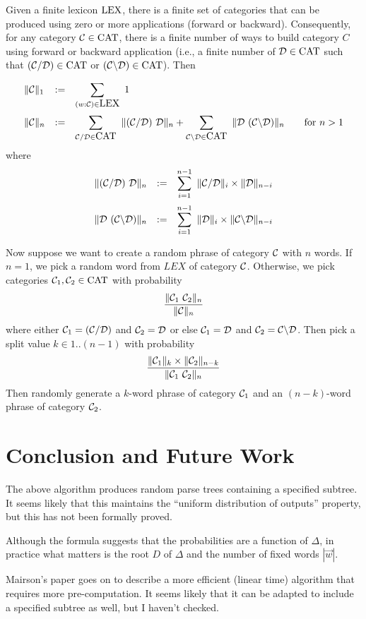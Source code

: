 \documentclass[12pt]{article}
\begin{document}
Given a finite lexicon $\mbox{LEX}$, there is a finite set \CAT{} of categories that can be produced using zero or more applications (forward or backward). Consequently,
for any category \({\cal C} \in \mbox{CAT}\), there is a finite number of ways to build
category $C$ using forward or backward application (i.e., a finite number
of \({\cal D}\in\mbox{CAT}\) such that \(({\cal C}/{\cal D})\in\mbox{CAT}\) or \(({\cal C}\backslash {\cal D})\in\mbox{CAT}\)). Then

\[
    \begin{array}{lcl}
    \|\C\|_1 &:=& \displaystyle\sum_{(w{:}\C)\in \LEX}\  1\\
    \noalign{\medskip}
    \|\C\|_n &:=& \displaystyle\sum_{\C/\D\in\CAT}\  \|(\C/\D)\ \D\|_n +
    \sum_{\C\backslash\D\in\CAT}\ \| \D\ (\C\backslash \D)\|_n\qquad\mbox{for $n>1$}
    \end{array}
\]
where
\[
    \begin{array}{lcl}
    \|(\C/\D)\ \D\|_n &:=& \displaystyle\sum_{i=1}^{n-1}\ \|\C/\D\|_i\times\|\D\|_{n-i}\\
    \noalign{\medskip}
    \|\D\ (\C\backslash \D)\|_n &:=& \displaystyle\sum_{i=1}^{n-1}\ \|\D\|_i\times\|\C\backslash \D\|_{n-i}

\end{array}
\]

Now suppose we want to create a random phrase of category ${\cal C}$ with $n$ words.
If $n = 1$, we pick a random word from $LEX$ of category  ${\cal C}$. Otherwise, we pick categories \({\cal C}_1,{\cal C}_2\in\mbox{CAT}\) with probability
\[
\frac{\|\C_1\ \C_2\|_n}{\|\C\|_n}
\]
where either ${\cal C}_1 = ({\cal C}/{\cal D})$ and ${\cal C}_2 = {\cal D}$ or else \({\cal C}_1={\cal D}\) and \({\cal C}_2= {\cal C}\backslash{\cal D}\). Then pick a split value $k\in 1..(n-1)$ with probability
\[
    \frac{\|\C_1\|_k\times\|\C_2\|_{n{-}k}}{\|\C_1\ \C_2\|_n}
  \]
  Then randomly generate a $k$-word phrase of category \({\cal C}_1\) and an \((n{-}k)\)-word phrase of category \({\cal C}_2\).




\section{Conclusion and Future Work}

The above algorithm produces random parse trees containing a specified subtree.
It seems likely that this maintains the ``uniform distribution of outputs'' property, but this has not been formally proved.

Although the formula suggests that the probabilities are a function of $\Delta$, in practice what matters is the root $D$ of $\Delta$ and the number of fixed words $|\vec{w}|$.

Mairson's paper goes on to describe a more efficient (linear time) algorithm that requires more pre-computation. It seems likely that it can be adapted to include a specified subtree as well, but I haven't checked.
\end{document}
